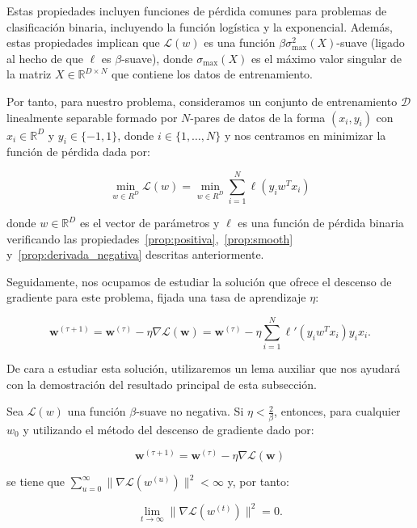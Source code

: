 Estas propiedades incluyen funciones de pérdida comunes para problemas de clasificación binaria, incluyendo la función logística y la exponencial. Además, estas propiedades implican que $\mathcal{L}(w)$ es una función $\beta \sigma^{2}_{\max}(X)$-suave (ligado al hecho de que $\ell$ es $\beta$-suave), donde $\sigma_{\max}(X)$ es el máximo valor singular de la matriz $X \in \mathbb{R}^{D \times N}$ que contiene los datos de entrenamiento.\newline

Por tanto, para nuestro problema, consideramos un conjunto de entrenamiento $\mathcal{D}$ linealmente separable formado por $N$-pares de datos de la forma $(x_i, y_i)$ con $x_i \in \mathbb{R}^{D}$ y $y_i \in \{ -1, 1\}$, donde $i \in \{1, \ldots, N \}$ y nos centramos en minimizar la función de pérdida dada por:

\[
    \min_{w \in R^{D}}\mathcal{L}(w) = \min_{w \in R^{D}} \sum_{i=1}^{N} \ell(y_i w^{T}x_i)
\]

donde $w \in \mathbb{R}^{D}$ es el vector de parámetros y $\ell$ es una función de pérdida binaria verificando las propiedades~\ref{prop:positiva},~\ref{prop:smooth} y~\ref{prop:derivada_negativa} descritas anteriormente.\newline

Seguidamente, nos ocupamos de estudiar la solución que ofrece el descenso de gradiente para este problema, fijada una tasa de aprendizaje $\eta$:

\[
    \mathbf{w}^{(\tau + 1)} = \mathbf{w}^{(\tau)} - \eta \nabla \mathcal{L}(\mathbf{w}) = \mathbf{w}^{(\tau)} - \eta \sum_{i=1}^{N} \ell'(y_i w^{T}x_i)y_i x_i.
\]\newline

De cara a estudiar esta solución, utilizaremos un lema auxiliar que nos ayudará con la demostración del resultado principal de esta subsección.
\begin{lema}\label{lema:raro-clasificación-gd}
    Sea $\mathcal{L}(w)$ una función $\beta$-suave no negativa. Si $\eta < \frac{2}{\beta}$, entonces, para cualquier $w_0$ y utilizando el método del descenso de gradiente dado por:

    \[
        \mathbf{w}^{(\tau + 1)} = \mathbf{w}^{(\tau)} - \eta \nabla \mathcal{L}(\mathbf{w})
    \]

    se tiene que $\sum_{u=0}^{\infty} \| \nabla\mathcal{L}(w^{(u)}) \|^{2} < \infty$ y, por tanto:

    \[
        \lim \limits_{t \to \infty} \| \nabla\mathcal{L}(w^{(t)}) \|^{2} = 0.
    \]
\end{lema}

